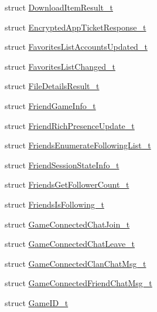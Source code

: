 \begin{DoxyCompactItemize}
\item 
struct \hyperlink{struct_valve_1_1_steamworks_1_1_download_item_result__t}{Download\+Item\+Result\+\_\+t}
\item 
struct \hyperlink{struct_valve_1_1_steamworks_1_1_encrypted_app_ticket_response__t}{Encrypted\+App\+Ticket\+Response\+\_\+t}
\item 
struct \hyperlink{struct_valve_1_1_steamworks_1_1_favorites_list_accounts_updated__t}{Favorites\+List\+Accounts\+Updated\+\_\+t}
\item 
struct \hyperlink{struct_valve_1_1_steamworks_1_1_favorites_list_changed__t}{Favorites\+List\+Changed\+\_\+t}
\item 
struct \hyperlink{struct_valve_1_1_steamworks_1_1_file_details_result__t}{File\+Details\+Result\+\_\+t}
\item 
struct \hyperlink{struct_valve_1_1_steamworks_1_1_friend_game_info__t}{Friend\+Game\+Info\+\_\+t}
\item 
struct \hyperlink{struct_valve_1_1_steamworks_1_1_friend_rich_presence_update__t}{Friend\+Rich\+Presence\+Update\+\_\+t}
\item 
struct \hyperlink{struct_valve_1_1_steamworks_1_1_friends_enumerate_following_list__t}{Friends\+Enumerate\+Following\+List\+\_\+t}
\item 
struct \hyperlink{struct_valve_1_1_steamworks_1_1_friend_session_state_info__t}{Friend\+Session\+State\+Info\+\_\+t}
\item 
struct \hyperlink{struct_valve_1_1_steamworks_1_1_friends_get_follower_count__t}{Friends\+Get\+Follower\+Count\+\_\+t}
\item 
struct \hyperlink{struct_valve_1_1_steamworks_1_1_friends_is_following__t}{Friends\+Is\+Following\+\_\+t}
\item 
struct \hyperlink{struct_valve_1_1_steamworks_1_1_game_connected_chat_join__t}{Game\+Connected\+Chat\+Join\+\_\+t}
\item 
struct \hyperlink{struct_valve_1_1_steamworks_1_1_game_connected_chat_leave__t}{Game\+Connected\+Chat\+Leave\+\_\+t}
\item 
struct \hyperlink{struct_valve_1_1_steamworks_1_1_game_connected_clan_chat_msg__t}{Game\+Connected\+Clan\+Chat\+Msg\+\_\+t}
\item 
struct \hyperlink{struct_valve_1_1_steamworks_1_1_game_connected_friend_chat_msg__t}{Game\+Connected\+Friend\+Chat\+Msg\+\_\+t}
\item 
struct \hyperlink{struct_valve_1_1_steamworks_1_1_game_i_d__t}{Game\+I\+D\+\_\+t}
\item 

\end{DoxyCompactItemize}
